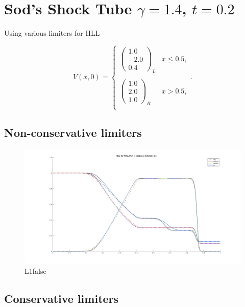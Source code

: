 
\subsectionfont{\fontsize{10}{10}\selectfont}

\graphicspath{{./assignment_04/figures/}}

\section{Sod's Shock Tube $\gamma = 1.4$, $t = 0.2$}%
Using various limiters for HLL

\[
V(x,0) =
\begin{cases}
 \begin{pmatrix}
   1.0 \\ -2.0 \\ 0.4
 \end{pmatrix}_L & x \leq 0.5, \\\\
 \begin{pmatrix}
   1.0 \\ 2.0 \\ 1.0 
 \end{pmatrix}_R & x > 0.5, \\
\end{cases}
.\] 

\subsection{Non-conservative limiters}%


\begin{figure}[H]
  \centering
  \includegraphics[width=0.8\linewidth]{HLL1false.png}
  \caption{L1false}%
  \label{fig:L1false}
\end{figure}

\subsection{Conservative limiters}%

